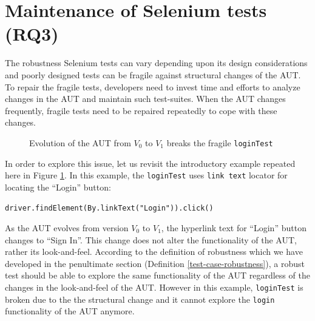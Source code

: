 

\section{Maintenance of Selenium tests (RQ3)}
\label{locatorMaintenance}
The robustness Selenium tests can vary depending upon its design considerations and poorly designed tests can be fragile against structural changes of the AUT. To repair the fragile tests, developers need to invest time and efforts to analyze changes in the AUT and maintain such test-suites. When the AUT changes frequently, fragile tests need to be repaired repeatedly to cope with these changes. 

\begin{figure}[ht!]
\centering     %
{}
\vspace{-2mm}
\caption{Evolution of the AUT from $V_{0}$ to $V_{1}$ breaks the fragile \texttt{loginTest} }
\label{fig:3loginTest}
\end{figure} 

In order to explore this issue, let us revisit the introductory example repeated here in Figure \ref{fig:3loginTest}. In this example, the \texttt{loginTest} uses \texttt{link text} locator for locating the ``Login'' button: \begin{small}
\texttt{driver.findElement(By.linkText("Login")).click()}
\end{small}
As the AUT evolves from version $V_{0}$ to $V_{1}$, the hyperlink text for ``Login'' button changes to ``Sign In''. This change does not alter the functionality of the AUT, rather its look-and-feel. According to the definition of robustness which we have developed in the penultimate section (Definition \ref{test-case-robustness}), a robust test should be able to explore the same functionality of the AUT regardless of the changes in the look-and-feel of the AUT. However in this example, \texttt{loginTest} is broken due to the the structural change and it cannot explore the \texttt{login} functionality of the AUT anymore. 

